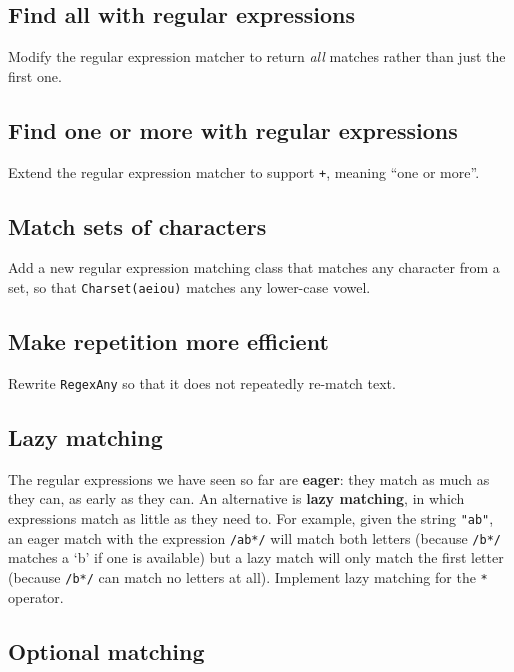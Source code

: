 \documentclass[krantzl]{krantz}
\newcommand{\glossref}[1]{\textbf{#1}}
\begin{document}
\subsection*{Find all with regular expressions}


Modify the regular expression matcher to return \emph{all} matches rather than just the first one.

\subsection*{Find one or more with regular expressions}


Extend the regular expression matcher to support \texttt{+}, meaning “one or more”.

\subsection*{Match sets of characters}


Add a new regular expression matching class that matches any character from a set,
so that \texttt{Charset({\textquotesingle}aeiou{\textquotesingle})} matches any lower-case vowel.

\subsection*{Make repetition more efficient}


Rewrite \texttt{RegexAny} so that it does not repeatedly re-match text.

\subsection*{Lazy matching}


The regular expressions we have seen so far are \glossref{eager}:
they match as much as they can, as early as they can.
An alternative is \glossref{lazy matching},
in which expressions match as little as they need to.
For example,
given the string \texttt{"ab"},
an eager match with the expression \texttt{/ab*/} will match both letters
(because \texttt{/b*/} matches a ‘b’ if one is available)
but a lazy match will only match the first letter
(because \texttt{/b*/} can match no letters at all).
Implement lazy matching for the \texttt{*} operator.

\subsection*{Optional matching}
\end{document}
